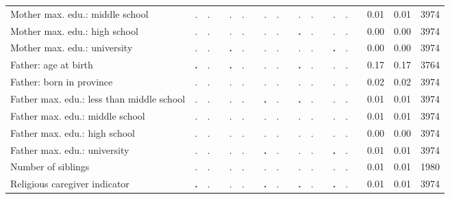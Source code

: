 \begin{tabular}{l c c c c c c c c c c c c c c c c c c}
Mother max. edu.: middle school &         . &         . & &         . &         . & &         . &         . & &         . &         . & &         . &         . & &      0.01 &      0.01 &      3974 \\
Mother max. edu.: high school &         . &         . & &         . &         . & &         . &         . & & \textbf{        .} &         . & &         . &         . & &      0.00 &      0.00 &      3974 \\
Mother max. edu.: university &         . &         . & & \textbf{        .} &         . & &         . &         . & &         . &         . & & \textbf{        .} &         . & &      0.00 &      0.00 &      3974 \\
Father: age at birth & \textbf{        .} &         . & & \textbf{        .} &         . & &         . &         . & & \textbf{        .} &         . & &         . &         . & &      0.17 &      0.17 &      3764 \\
Father: born in province &         . &         . & &         . &         . & &         . &         . & &         . &         . & &         . &         . & &      0.02 &      0.02 &      3974 \\
Father max. edu.: less than middle school &         . &         . & &         . &         . & & \textbf{        .} &         . & & \textbf{        .} &         . & &         . &         . & &      0.01 &      0.01 &      3974 \\
Father max. edu.: middle school &         . &         . & &         . &         . & &         . &         . & &         . &         . & &         . &         . & &      0.01 &      0.01 &      3974 \\
Father max. edu.: high school &         . &         . & &         . &         . & &         . &         . & &         . &         . & &         . &         . & &      0.00 &      0.00 &      3974 \\
Father max. edu.: university &         . &         . & &         . &         . & & \textbf{        .} &         . & &         . &         . & & \textbf{        .} &         . & &      0.01 &      0.01 &      3974 \\
Number of siblings &         . &         . & &         . &         . & &         . &         . & &         . &         . & &         . &         . & &      0.01 &      0.01 &      1980 \\
Religious caregiver indicator & \textbf{        .} &         . & &         . &         . & & \textbf{        .} &         . & & \textbf{        .} &         . & & \textbf{        .} &         . & &      0.01 &      0.01 &      3974 \\

\end{tabular}
